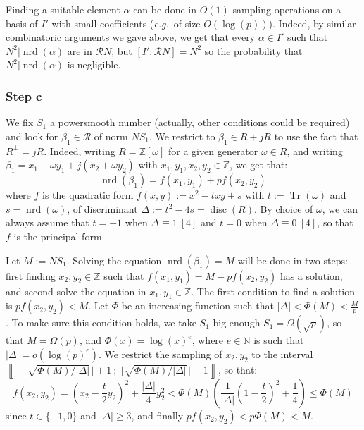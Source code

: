 \documentclass[a4paper,10pt]{report}
\theoremstyle{definition}
\theoremstyle{plain}
\theoremstyle{definition}
\newcommand{\eg}{\emph{e.g.}\ }
\newcommand{\N}{\mathbb{N}}
\newcommand{\Z}{\mathbb{Z}}
\newcommand{\m}[1]{\mathcal{#1}}
\renewcommand{\i}[2]{\left\llbracket #1~;~#2\right\rrbracket}
\renewcommand{\(}{\left(}
\renewcommand{\)}{\right)}
\DeclareMathOperator{\Tr}{Tr}
\DeclareMathOperator{\disc}{disc}
\DeclareMathOperator{\nrd}{nrd}
\begin{document}
Finding a suitable element $\alpha$ can be done in $O(1)$ sampling operations on a basis of $I'$ with small coefficients (\eg of size $O(\log(p))$).  Indeed, by similar combinatoric arguments we gave above, we get that every $\alpha\in I'$ such that $N^2|\nrd(\alpha)$ are in $\m{R}N$, but $[I':\m{R}N]=N^2$ so the probability that $N^2|\nrd(\alpha)$ is negligible.

\subsubsection{Step c}

We fix $S_1$ a powersmooth number (actually,  other conditions could be required) and look for $\beta_1\in\m{R}$ of norm $NS_1$. We restrict to $\beta_1\in R+jR$ to use the fact that $R^\bot=jR$.  Indeed, writing $R=\Z[\omega]$ for a given generator $\omega\in R$, and writing $\beta_1=x_1+\omega y_1+j(x_2+\omega y_2)$ with $x_1, y_1, x_2, y_2\in\Z$, we get that:
\[\nrd(\beta_1)=f(x_1,y_1)+pf(x_2,y_2)\]
where $f$ is the quadratic form $f(x,y):=x^2-t xy+s$ with $t:=\Tr(\omega)$ and $s=\nrd(\omega)$, of discriminant $\Delta:=t^2-4s=\disc(R)$.  By choice of $\omega$, we can always assume that $t=-1$ when $\Delta\equiv 1 \ [4]$ and $t=0$ when $\Delta\equiv 0 \ [4]$, so that $f$ is the principal form.  

Let $M:=NS_1$. Solving the equation $\nrd(\beta_1)=M$ will be done in two steps: first finding $x_2,y_2\in\Z$ such that $f(x_1,y_1)=M-pf(x_2,y_2)$ has a solution, and second solve the equation in $x_1,y_1\in\Z$.  The first condition to find a solution is $pf(x_2,y_2)<M$. Let $\Phi$ be an increasing function such that $|\Delta|<\Phi(M)<\frac{M}{p}$. To make sure this condition holds, we take $S_1$ big enough $S_1=\Omega(\sqrt{p})$, so that $M=\Omega(p)$, and $\Phi(x)=\log(x)^e$, where $e\in\N$ is such that $|\Delta|=o(\log(p)^e)$.  We restrict the sampling of $x_2, y_2$ to the interval $\i{-\lfloor\sqrt{\Phi(M)/|\Delta|}\rfloor+1}{\lfloor\sqrt{\Phi(M)/|\Delta|}\rfloor-1}$, so that:
\[f(x_2,y_2)=\(x_2-\frac{t}{2}y_2\)^2+\frac{|\Delta|}{4}y_2^2<\Phi(M)\(\frac{1}{|\Delta|}\(1-\frac{t}{2}\)^2+\frac{1}{4}\)\leq \Phi(M)\]
since $t\in\{-1,0\}$ and $|\Delta|\geq 3$, and finally $pf(x_2,y_2)<p\Phi(M)<M$. 
\end{document}
